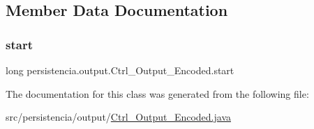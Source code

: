 \subsection{Member Data Documentation}
\mbox{\label{classpersistencia_1_1output_1_1Ctrl__Output__Encoded_a297adbe95417ad0a03883da607ec6dfe}} 
\subsubsection{\texorpdfstring{start}{start}}
{\footnotesize\ttfamily long persistencia.\+output.\+Ctrl\+\_\+\+Output\+\_\+\+Encoded.\+start\hspace{0.3cm}{\ttfamily [private]}}



The documentation for this class was generated from the following file\+:\begin{DoxyCompactItemize}
\item 
src/persistencia/output/\hyperlink{Ctrl__Output__Encoded_8java}{Ctrl\+\_\+\+Output\+\_\+\+Encoded.\+java}\end{DoxyCompactItemize}
